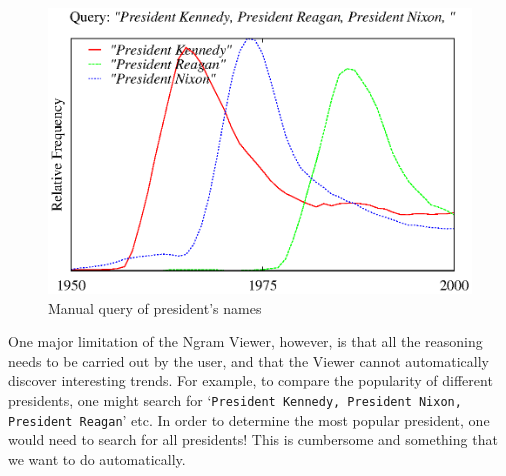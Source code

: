 \documentclass[11pt,a4paper]{article}
\newcommand{\query}[1]{\texttt{#1}}
\begin{document}
\begin{figure}
\includegraphics[width=\columnwidth]{graphs/kenreanixon}
\caption{\label{fig:manual president} Manual query of president's names}
\end{figure}

One major limitation of the Ngram Viewer, however, is that all the reasoning needs to be carried out by the user, and that the Viewer cannot automatically discover interesting trends. For example, to compare the popularity of different presidents, one might search for `\query{President Kennedy, President Nixon, President Reagan}' etc. In order to determine the most popular president, one would need to search for all presidents! This is cumbersome and something that we want to do automatically.

\end{document}
